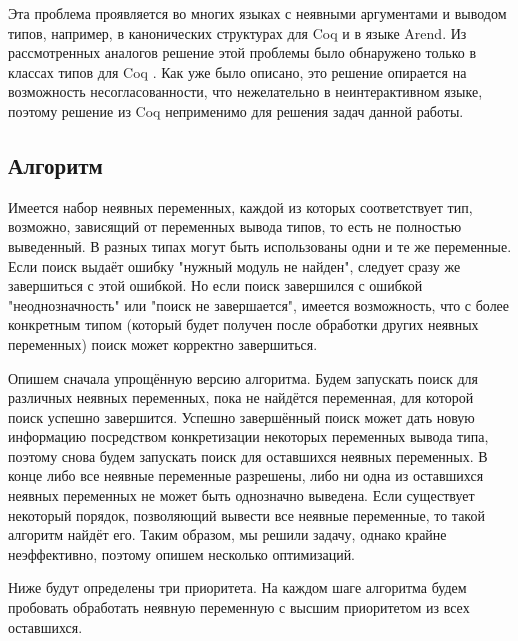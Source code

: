 \documentclass[../diploma.tex]{subfiles}
\begin{document}
Эта проблема проявляется во многих языках с неявными аргументами и выводом типов, например, в канонических структурах для Coq и в языке Arend. Из рассмотренных аналогов решение этой проблемы было обнаружено только в классах типов для Coq \cite{coq_typeclasses}. Как уже было описано, это решение опирается на возможность несогласованности, что нежелательно в неинтерактивном языке, поэтому решение из Coq неприменимо для решения задач данной работы.

\subsection{Алгоритм}

Имеется набор неявных переменных, каждой из которых соответствует тип, возможно, зависящий от переменных вывода типов, то есть не полностью выведенный. В разных типах могут быть использованы одни и те же переменные. Если поиск выдаёт ошибку "нужный модуль не найден", следует сразу же завершиться с этой ошибкой. Но если поиск завершился с ошибкой "неоднозначность" или "поиск не завершается", имеется возможность, что с более конкретным типом (который будет получен после обработки других неявных переменных) поиск может корректно завершиться.  

Опишем сначала упрощённую версию алгоритма. Будем запускать поиск для различных неявных переменных, пока не найдётся переменная, для которой поиск успешно завершится. Успешно завершённый поиск может дать новую информацию посредством конкретизации некоторых переменных вывода типа, поэтому снова будем запускать поиск для оставшихся неявных переменных. В конце либо все неявные переменные разрешены, либо ни одна из оставшихся неявных переменных не может быть однозначно выведена. Если существует некоторый порядок, позволяющий вывести все неявные переменные, то такой алгоритм найдёт его. Таким образом, мы решили задачу, однако крайне неэффективно, поэтому опишем несколько оптимизаций.

Ниже будут определены три приоритета. На каждом шаге алгоритма будем пробовать обработать неявную переменную с высшим приоритетом из всех оставшихся.
\end{document}
